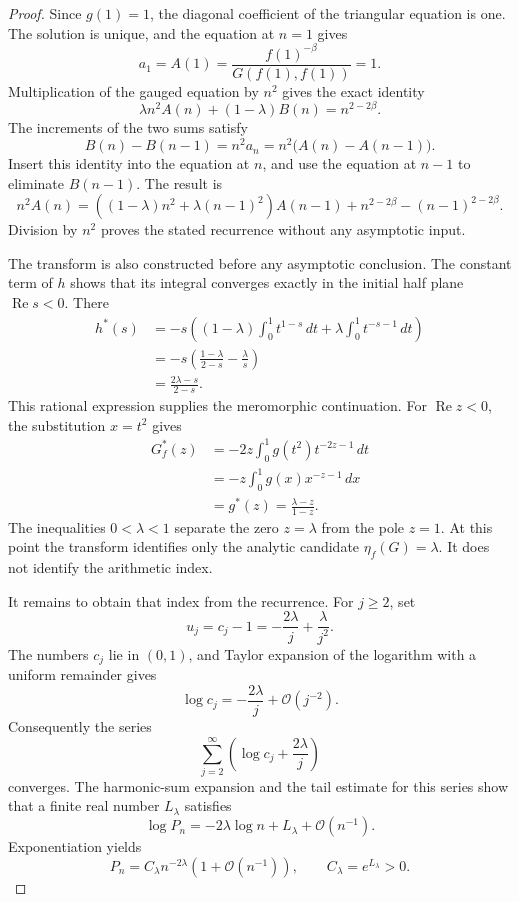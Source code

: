 \documentclass[10pt,a4paper]{amsart}
\renewcommand{\Re}{\operatorname{Re}}
\begin{document}
\begin{proof}
Since \(g(1)=1\), the diagonal coefficient of the triangular equation is
one. The solution is unique, and the equation at \(n=1\) gives
\[
a_1=A(1)
=\frac{f(1)^{-\beta}}{G(f(1),f(1))}
=1.
\]
Multiplication of the gauged equation by \(n^2\) gives the exact identity
\[
\lambda n^2A(n)+(1-\lambda)B(n)=n^{2-2\beta}.
\]
The increments of the two sums satisfy
\[
B(n)-B(n-1)
=n^2a_n
=n^2\bigl(A(n)-A(n-1)\bigr).
\]
Insert this identity into the equation at \(n\), and use the equation at
\(n-1\) to eliminate \(B(n-1)\). The result is
\[
n^2A(n)
=\left((1-\lambda)n^2+\lambda(n-1)^2\right)A(n-1)
+n^{2-2\beta}-(n-1)^{2-2\beta}.
\]
Division by \(n^2\) proves the stated recurrence without any asymptotic
input.

The transform is also constructed before any asymptotic conclusion. The
constant term of \(h\) shows that its integral converges exactly in the
initial half plane \(\Re s<0\). There
\[
\begin{aligned}
h^*(s)
&=-s\left(
(1-\lambda)\int_0^1t^{1-s}\,dt
+\lambda\int_0^1t^{-s-1}\,dt
\right)\\
&=-s\left(
\frac{1-\lambda}{2-s}-\frac{\lambda}{s}
\right)\\
&=\frac{2\lambda-s}{2-s}.
\end{aligned}
\]
This rational expression supplies the meromorphic continuation. For
\(\Re z<0\), the substitution \(x=t^2\) gives
\[
\begin{aligned}
G^*_f(z)
&=-2z\int_0^1g(t^2)t^{-2z-1}\,dt\\
&=-z\int_0^1g(x)x^{-z-1}\,dx\\
&=g^*(z)
=\frac{\lambda-z}{1-z}.
\end{aligned}
\]
The inequalities \(0<\lambda<1\) separate the zero \(z=\lambda\) from the
pole \(z=1\). At this point the transform identifies only the analytic
candidate \(\eta_f(G)=\lambda\). It does not identify the arithmetic index.

It remains to obtain that index from the recurrence. For \(j\geq2\), set
\[
u_j=c_j-1=-\frac{2\lambda}{j}+\frac{\lambda}{j^2}.
\]
The numbers \(c_j\) lie in \((0,1)\), and Taylor expansion of the logarithm
with a uniform remainder gives
\[
\log c_j=-\frac{2\lambda}{j}+\mathcal O(j^{-2}).
\]
Consequently the series
\[
\sum_{j=2}^{\infty}
\left(\log c_j+\frac{2\lambda}{j}\right)
\]
converges. The harmonic-sum expansion and the tail estimate for this series
show that a finite real number \(L_\lambda\) satisfies
\[
\log P_n=-2\lambda\log n+L_\lambda+\mathcal O(n^{-1}).
\]
Exponentiation yields
\[
P_n=C_\lambda n^{-2\lambda}
\left(1+\mathcal O(n^{-1})\right),
\qquad
C_\lambda=e^{L_\lambda}>0.
\]


\end{proof}
\end{document}
